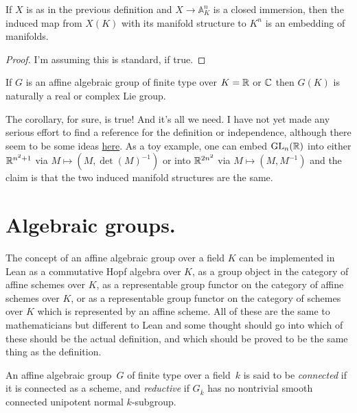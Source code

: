 \begin{theorem}\label{manifold_on_algebraic_variety_computation}\notready
    If $X$ is as in the previous definition and $X\to\mathbb{A}^n_K$ is a closed immersion, then the induced map from $X(K)$ with its manifold structure to $K^n$ is an embedding of manifolds. 
\end{theorem}
\begin{proof} I'm assuming this is standard, if true. 
\end{proof}
\begin{corollary}\label{lie_group_from_algebraic_group}\notready
    If $G$ is an affine algebraic group of finite type over $K=\mathbb{R}$ or ${\mathbb{C}}$ then $G(K)$ is naturally a real or complex Lie group.
\end{corollary}
\begin{remark}

    The corollary, for sure, is true! And it's all we need. I have not yet made any serious effort to find a reference for the definition or independence, although there seem to be some ideas \href{https://leanprover.zulipchat.com/#narrow/stream/116395-maths/topic/top.20space.20.2F.20manifold.20structure.20on.20points.20of.20alg.20varieties/near/431812525}{here}. As a toy example, one can embed $\operatorname{GL}_n(\mathbb{R})$ into either $\mathbb{R}^{n^2+1}$ via $M\mapsto (M,\det(M)^{-1})$ or into $\mathbb{R}^{2n^2}$ via $M\mapsto (M,M^{-1})$ and the claim is that the two induced manifold structures are the same.
\end{remark}
\section{Algebraic groups.}

The concept of an affine algebraic group over a field $K$ can be implemented in Lean as a commutative Hopf algebra over $K$, as a group object in the category of affine schemes over $K$, as a representable group functor on the category of affine schemes over $K$, or as a representable group functor on the category of schemes over $K$ which is represented by an affine scheme. All of these are the same to mathematicians but different to Lean and some thought should go into which of these should be the actual definition, and which should be proved to be the same thing as the definition.

\begin{definition}\label{connected_reductive_group}\notready An affine algebraic group~$G$ of finite type over a field~$k$ is said to be \emph{connected} if it is connected as a scheme, and \emph{reductive} if $G_{\overline{k}}$ has no nontrivial smooth connected unipotent normal $k$-subgroup.
\end{definition}

